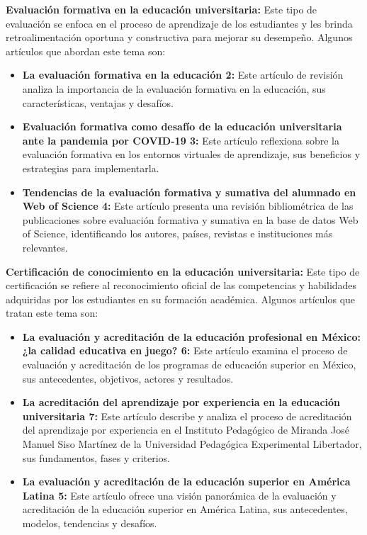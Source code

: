 \documentclass{article}
\begin{document}
\textbf{Evaluación formativa en la educación universitaria:}
Este tipo de evaluación se enfoca en el proceso de aprendizaje de los estudiantes y les brinda retroalimentación oportuna y constructiva para mejorar su desempeño. Algunos artículos que abordan este tema son:
\begin{itemize}
    \item \textbf{La evaluación formativa en la educación 2:} Este artículo de revisión analiza la importancia de la evaluación formativa en la educación, sus características, ventajas y desafíos. \cite{fuente2}
    \item \textbf{Evaluación formativa como desafío de la educación universitaria ante la pandemia por COVID-19 3:} Este artículo reflexiona sobre la evaluación formativa en los entornos virtuales de aprendizaje, sus beneficios y estrategias para implementarla. \cite{fuente3}
    \item \textbf{Tendencias de la evaluación formativa y sumativa del alumnado en Web of Science 4:} Este artículo presenta una revisión bibliométrica de las publicaciones sobre evaluación formativa y sumativa en la base de datos Web of Science, identificando los autores, países, revistas e instituciones más relevantes. \cite{fuente4}
\end{itemize}

\textbf{Certificación de conocimiento en la educación universitaria:}
Este tipo de certificación se refiere al reconocimiento oficial de las competencias y habilidades adquiridas por los estudiantes en su formación académica. Algunos artículos que tratan este tema son:
\begin{itemize}
    \item \textbf{La evaluación y acreditación de la educación profesional en México: ¿la calidad educativa en juego? 6:} Este artículo examina el proceso de evaluación y acreditación de los programas de educación superior en México, sus antecedentes, objetivos, actores y resultados. \cite{fuente6}
    \item \textbf{La acreditación del aprendizaje por experiencia en la educación universitaria 7:} Este artículo describe y analiza el proceso de acreditación del aprendizaje por experiencia en el Instituto Pedagógico de Miranda José Manuel Siso Martínez de la Universidad Pedagógica Experimental Libertador, sus fundamentos, fases y criterios. \cite{fuente7}
    \item \textbf{La evaluación y acreditación de la educación superior en América Latina 5:} Este artículo ofrece una visión panorámica de la evaluación y acreditación de la educación superior en América Latina, sus antecedentes, modelos, tendencias y desafíos. \cite{fuente5}
\end{itemize}
\end{document}
